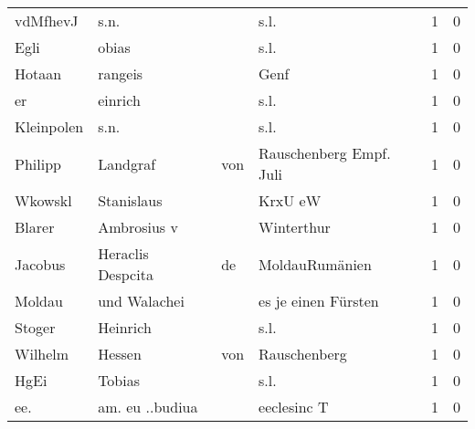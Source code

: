 \begin{center}
\begin{tiny}
\begin{longtabu}{llllrr}
                 vdMfhevJ &                               s.n. &             &                                        s.l. &          1 &         0 \\
                     Egli &                              obias &             &                                        s.l. &          1 &         0 \\
                   Hotaan &                            rangeis &             &                                        Genf &          1 &         0 \\
                       er &                            einrich &             &                                        s.l. &          1 &         0 \\
               Kleinpolen &                               s.n. &             &                                        s.l. &          1 &         0 \\
                  Philipp &                           Landgraf &         von &                     Rauschenberg Empf. Juli &          1 &         0 \\
                  Wkowskl &                         Stanislaus &             &                                     KrxU eW &          1 &         0 \\
                   Blarer &                        Ambrosius v &             &                                  Winterthur &          1 &         0 \\
                  Jacobus &                  Heraclis Despcita &          de &                              MoldauRumänien &          1 &         0 \\
                   Moldau &                       und Walachei &             &                         es je einen Fürsten &          1 &         0 \\
                   Stoger &                           Heinrich &             &                                        s.l. &          1 &         0 \\
                  Wilhelm &                             Hessen &         von &                                Rauschenberg &          1 &         0 \\
                     HgEi &                             Tobias &             &                                        s.l. &          1 &         0 \\
                      ee. &                    am. eu ..budiua &             &                                 eeclesinc T &          1 &         0 \\

\end{longtabu}
\end{tiny}
\end{center}
